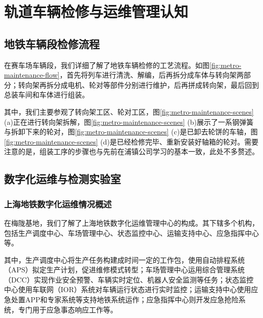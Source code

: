 ﻿\section{轨道车辆检修与运维管理认知}

\subsection{地铁车辆段检修流程}
在赛车场车辆段，我们详细了解了地铁车辆检修的工艺流程。如图\ref{fig:metro-maintenance-flow}，首先将列车进行清洗、解编，后再拆分成车体与转向架两部分；转向架再拆分成电机、轮对等部件分别进行维护，后再拼成转向架，最后回到总装车间和车体进行组装。\par{}
其中，我们主要参观了转向架工区、轮对工区，图\ref{fig:metro-maintenance-scenes} (a)正在进行转向架拆解，图\ref{fig:metro-maintenance-scenes} (b)展示了一系钢弹簧与拆卸下来的轮对，图\ref{fig:metro-maintenance-scenes} (c)是已卸去轮饼的车轴，图\ref{fig:metro-maintenance-scenes} (d)是已经检修完毕、重新安装好轴箱的轮对。需要注意的是，组装工序的步骤也与先前在浦镇公司学习的基本一致，此处不多赘述。\par{}

\subsection{数字化运维与检测实验室}

\subsubsection{上海地铁数字化运维情况概述}
在梅陇基地，我们了解了上海地铁数字化运维管理中心的构成。其下辖多个机构，包括生产调度中心、车场管理中心、状态监控中心、运输支持中心、应急指挥中心等。\par{}
其中，生产调度中心将生产任务构建成时间一定的工作包，使用自动排程系统（APS）拟定生产计划，促进维修模式转型；车场管理中心运用综合管理系统（DCC）实现作业安全预警、车辆实时定位、机器人安全监测等任务；状态监控中心使用车联网（IOR）系统对车辆运行状态进行实时监控；运输支持中心使用应急处置APP和专家系统等支持地铁系统运作；应急指挥中心则开发应急抢险系统，专门用于应急事态响应工作等。\par{}

